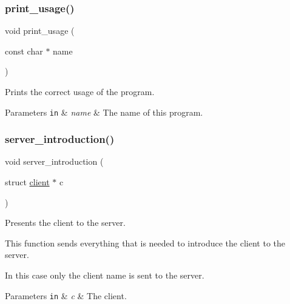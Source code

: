 \subsubsection{\texorpdfstring{print\+\_\+usage()}{print\_usage()}}
{\footnotesize\ttfamily void print\+\_\+usage (\begin{DoxyParamCaption}\item[{const char $\ast$}]{name }\end{DoxyParamCaption})}



Prints the correct usage of the program. 


\begin{DoxyParams}[1]{Parameters}
\mbox{\tt in}  & {\em name} & The name of this program. \\
\hline
\end{DoxyParams}
\mbox{\label{zip-zop-client_8c_acb0e43d47379736b891394dd383064be}} 
\subsubsection{\texorpdfstring{server\+\_\+introduction()}{server\_introduction()}}
{\footnotesize\ttfamily void server\+\_\+introduction (\begin{DoxyParamCaption}\item[{struct \hyperlink{structclient}{client} $\ast$}]{c }\end{DoxyParamCaption})}



Presents the client to the server. 

This function sends everything that is needed to introduce the client to the server.

In this case only the client name is sent to the server.


\begin{DoxyParams}[1]{Parameters}
\mbox{\tt in}  & {\em c} & The client. \\
\hline
\end{DoxyParams}
\mbox{\label{zip-zop-client_8c_aec5550cf115ba01d0da023ba9d1876bb}} 
